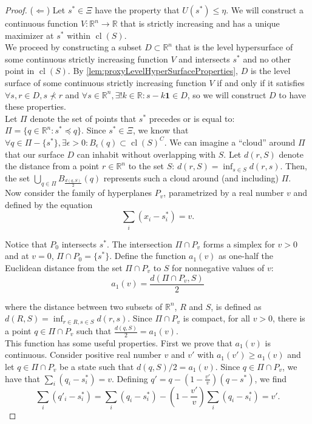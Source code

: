 \documentclass{article}
\DeclareMathOperator*{\cl}{cl}
\begin{document}
\begin{proof}
($\Longleftarrow$) Let $s^* \in \Xi$ have the property that $U(s^*) \leq \eta$. We will construct a continuous function $V : \mathbb R^n \rightarrow \mathbb R$ that is strictly increasing and has a unique maximizer at $s^*$ within $\cl(S)$.\\

We proceed by constructing a subset $D \subset \mathbb R^n$ that is the level hypersurface of some continuous strictly increasing function $V$ and intersects $s^*$ and no other point in $\cl(S)$. By \cref{lem:proxyLevelHyperSurfaceProperties}, $D$ is the level surface of some continuous strictly increasing function $V$ if and only if it satisfies $\forall s, r \in D, s \not\prec r$ and $\forall s \in \mathbb R^n, \exists! k \in \mathbb R : s - k \bm 1 \in D$, so we will construct $D$ to have these properties.\\

Let $\Pi$ denote the set of points that $s^*$ precedes or is equal to: $\Pi = \{q \in \mathbb R^n : s^* \preceq q\}$. Since $s^* \in \Xi$, we know that $\forall q \in \Pi - \{s^*\}, \exists \epsilon > 0 : B_\epsilon (q) \subset \cl (S)^C$. We can imagine a ``cloud'' around $\Pi$ that our surface $D$ can inhabit without overlapping with $S$. Let $d(r, S)$ denote the distance from a point $r \in \mathbb R^n$ to the set $S$: $d(r, S) = \inf_{s \in S} d(r,s)$. Then, the set $\bigcup_{q \in \Pi} B_{\frac{d(q, S)}{2}}(q)$ represents such a cloud around (and including) $\Pi$.\\

Now consider the family of hyperplanes $P_v$, parametrized by a real number $v$ and defined by the equation
$$\sum_i (x_i - s^*_i) = v.$$

Notice that $P_0$ intersects $s^*$. The intersection $\Pi \cap P_v$ forms a simplex for $v>0$ and at $v=0$, $\Pi \cap P_0 = \{s^*\}$. Define the function $a_1(v)$ as one-half the Euclidean distance from the set $\Pi \cap P_v$ to $S$ for nonnegative values of $v$:
$$a_1(v) = \frac{d(\Pi \cap P_v, S)}{2}$$

where the distance between two subsets of $\mathbb R^n$, $R$ and $S$, is defined as $d(R,S) = \inf_{r \in R, s \in S} d(r,s)$. Since $\Pi \cap P_v$ is compact, for all $v>0$, there is a point $q \in \Pi \cap P_v$ such that $\frac{d(q, S)}{2} = a_1(v)$.\\

This function has some useful properties. First we prove that $a_1(v)$ is continuous. Consider positive real number $v$ and $v'$ with $a_1(v') \geq a_1(v)$ and let $q \in \Pi \cap P_v$ be a state such that $d(q, S)/2 = a_1(v)$. Since $q \in \Pi \cap P_v$, we have that $\sum_i (q_i - s^*_i) = v$. Defining $q' = q - (1-\frac{v'}{v})(q-s^*)$, we find
$$\sum_i (q'_i - s^*_i) = \sum_i (q_i - s^*_i) - \left(1-\frac{v'}{v}\right)\sum_i (q_i - s^*_i) =  v'.$$


\end{proof}
\end{document}

